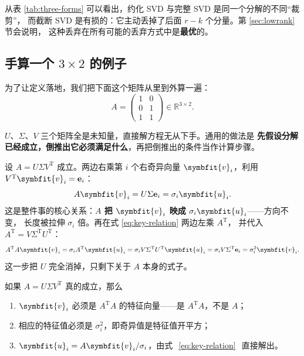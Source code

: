 \documentclass[UTF8, 11pt, a4paper, fontset=windows]{ctexart}
\theoremstyle{cnthm}
\theoremstyle{cndef}
\newcommand{\T}{^{\mathrm{T}}}
\newcommand{\R}{\mathbb{R}}
\newcommand{\bu}{\symbfit{u}}
\newcommand{\vv}{\symbfit{v}}
\begin{document}
从表 \ref{tab:three-forms} 可以看出，约化 SVD 与完整 SVD 是同一个分解的不同“裁剪”，
而截断 SVD 是有损的：它主动丢掉了后面 $r-k$ 个分量。第 \ref{sec:lowrank} 节会说明，
这种丢弃在所有可能的丢弃方式中是\textbf{最优}的。

\subsection{手算一个 \texorpdfstring{$3\times2$}{3x2} 的例子}

为了让定义落地，我们把下面这个矩阵从里到外算一遍：
\begin{equation}\label{eq:example3x2}
  A=\begin{pmatrix}1&0\\0&1\\1&1\end{pmatrix}\in\R^{3\times2}.
\end{equation}

$U$、$\Sigma$、$V$ 三个矩阵全是未知量，直接解方程无从下手。通用的做法是
\textbf{先假设分解已经成立，倒推出它必须满足什么}，再把倒推出的条件当作计算步骤。

设 $A=U\Sigma V\T$ 成立。两边右乘第 $i$ 个右奇异向量 $\vv_i$，利用 $V\T\vv_i=\mathbf{e}_i$：
\begin{equation}\label{eq:key-relation}
  A\vv_i=U\Sigma\mathbf{e}_i=\sigma_i\bu_i .
\end{equation}
这是整件事的核心关系：\textbf{$A$ 把 $\vv_i$ 映成 $\sigma_i\bu_i$}——方向不变，
长度被拉伸 $\sigma_i$ 倍。再在式 \eqref{eq:key-relation} 两边左乘 $A\T$，
并代入 $A\T=V\Sigma\T U\T$：
\begin{equation}\label{eq:key-eigen}
  A\T A\vv_i=\sigma_i A\T\bu_i
  =\sigma_i V\Sigma\T U\T\bu_i
  =\sigma_i V\Sigma\T\mathbf{e}_i
  =\sigma_i^2\vv_i .
\end{equation}
这一步把 $U$ 完全消掉，只剩下关于 $A$ 本身的式子。

\begin{keybox}[倒推出的三个必要条件]
如果 $A=U\Sigma V\T$ 真的成立，那么
\begin{enumerate}[leftmargin=1.5em, itemsep=2pt, topsep=2pt]
  \item $\vv_i$ 必须是 $A\T A$ 的特征向量——是 $A\T A$，不是 $A$；
  \item 相应的特征值必须是 $\sigma_i^2$，即奇异值是特征值开平方；
  \item $\bu_i=A\vv_i/\sigma_i$，由式 \textcolor{white}{(\ref*{eq:key-relation})} 直接解出。
\end{enumerate}
\end{keybox}
\end{document}
